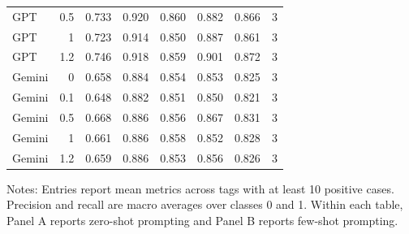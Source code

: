 \begin{table}[htbp]
\begin{threeparttable}
\begin{tabular}{lrrrrrrr}
GPT & 0.5 & 0.733 & 0.920 & 0.860 & 0.882 & 0.866 & 3 \\
GPT & 1 & 0.723 & 0.914 & 0.850 & 0.887 & 0.861 & 3 \\
GPT & 1.2 & 0.746 & 0.918 & 0.859 & 0.901 & 0.872 & 3 \\
Gemini & 0 & 0.658 & 0.884 & 0.854 & 0.853 & 0.825 & 3 \\
Gemini & 0.1 & 0.648 & 0.882 & 0.851 & 0.850 & 0.821 & 3 \\
Gemini & 0.5 & 0.668 & 0.886 & 0.856 & 0.867 & 0.831 & 3 \\
Gemini & 1 & 0.661 & 0.886 & 0.858 & 0.852 & 0.828 & 3 \\
Gemini & 1.2 & 0.659 & 0.886 & 0.853 & 0.856 & 0.826 & 3 \\
\bottomrule
\end{tabular}
\begin{tablenotes}[flushleft]
\footnotesize Notes: Entries report mean metrics across tags with at least 10 positive cases. Precision and recall are macro averages over classes 0 and 1. Within each table, Panel A reports zero-shot prompting and Panel B reports few-shot prompting.
\end{tablenotes}
\end{threeparttable}
\end{table}

